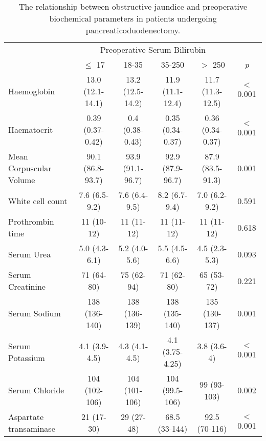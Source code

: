 	\begin{sidewaystable}[p]
		\caption{The relationship  between obstructive jaundice and preoperative biochemical parameters in patients undergoing pancreaticoduodenectomy. }
		\label{table:cpet_oj_bloods}
		\centering
		\renewcommand{\arraystretch}{1.4} %
		\setlength{\tabcolsep}{9pt} %
		
		\begin{tabular}{| l | c c c c |c|}
			\hline
			                           &                   \multicolumn{4}{c|}{Preoperative Serum Bilirubin}  &                 \\
			                           & $\leq$ 17        & 18-35            & 35-250           & $>$ 250          & \textit{p}       \\ \hline
			Haemoglobin                & 13.0 (12.1-14.1) & 13.2 (12.5-14.2) & 11.9 (11.1-12.4) & 11.7 (11.3-12.5) & $<$0.001 \\
			Haematocrit                & 0.39 (0.37-0.42) & 0.4 (0.38-0.43)  & 0.35 (0.34-0.37) & 0.36 (0.34-0.37) & $<$0.001 \\
			Mean Corpuscular Volume    & 90.1 (86.8-93.7) & 93.9 (91.1-96.7) & 92.9 (87.9-96.7) & 87.9 (83.5-91.3) & 0.001    \\
			White cell count           & 7.6 (6.5-9.2)    & 7.6 (6.4-9.5)    & 8.2 (6.7-9.4)    & 7.0 (6.2-9.2)    & 0.591    \\
			Prothrombin time           & 11 (10-12)       & 11 (11-12)       & 11 (11-12)       & 11 (11-12)       & 0.618    \\
			Serum Urea                 & 5.0 (4.3-6.1)    & 5.2 (4.0-5.6)    & 5.5 (4.5-6.6)    & 4.5 (2.3-5.3)    & 0.093    \\
			Serum Creatinine           & 71 (64-80)       & 75 (62-94)       & 71 (62-80)       & 65 (53-72)       & 0.221    \\
			Serum Sodium               & 138 (136-140)    & 138 (136-139)    & 138 (135-140)    & 135 (130-137)    & 0.001    \\
			Serum Potassium            & 4.1 (3.9-4.5)    & 4.3 (4.1-4.5)    & 4.1 (3.75-4.25)  & 3.8 (3.6-4)      & $<$0.001 \\
			Serum Chloride             & 104 (102-106)    & 104 (101-106)    & 104 (99.5-106)   & 99 (93-103)      & 0.002    \\
			Aspartate transaminase     & 21 (17-30)       & 29 (27-48)       & 68.5 (33-144)    & 92.5 (70-116)    & $<$0.001 \\

\end{tabular}
\end{sidewaystable}
